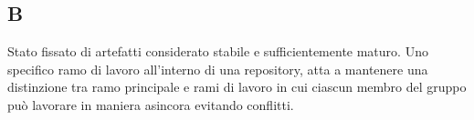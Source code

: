\begin{center}
\section*{B}
\end{center}
Stato fissato di artefatti considerato stabile e sufficientemente maturo.
Uno specifico ramo di lavoro all'interno di una repository, atta a mantenere una distinzione tra ramo principale e rami di lavoro in cui ciascun membro del gruppo può lavorare in maniera asincora evitando conflitti.
